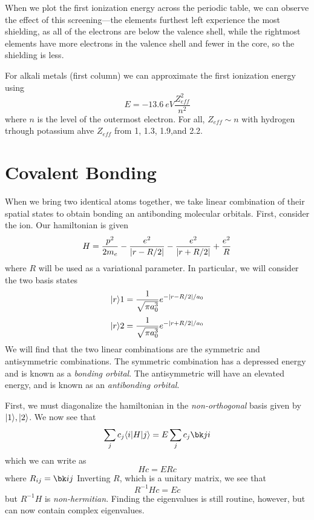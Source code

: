 When we plot the first ionization energy across the periodic table, we can observe the effect of this screening---the elements furthest left experience the most shielding, as all of the electrons are below the valence shell, while the rightmost elements have more electrons in the valence shell and fewer in the core, so the shielding is less. 

For alkali metals (first column) we can approximate the first ionization energy using
\[E = -\SI{13.6}{eV}\frac{Z_{eff}^2}{n^2}\]
where \(n\) is the level of the outermost electron. For all, \(Z_{eff}\sim n\) with hydrogen trhough potassium ahve \(Z_{eff}\) from 1, 1.3, 1.9,and 2.2.

\section{Covalent Bonding}
When we bring two identical atoms together, we take linear combination of their spatial states to obtain bonding an antibonding molecular orbitals. First, consider the  ion. Our hamiltonian is given
\[H = \frac{p^2}{2m_e}-\frac{e^2}{\left|r-R/2\right|}-\frac{e^2}{\left|r+R/2\right|} + \frac{e^2}{R}\]
where \(R\) will be used as a variational parameter. In particular, we will consider the two basis states
\[\lvert r\rangle{1} = \frac{1}{\sqrt{\pi a_0^3}}e^{-\left|r-R/2\right|/a_0}\]
\[\lvert r\rangle{2} = \frac{1}{\sqrt{\pi a_0^3}}e^{-\left|r+R/2\right|/a_0}\]
We will find that the two linear combinations are the symmetric and antisymmetric combinations. The symmetric combination has a depressed energy and is known as a \emph{bonding orbital}. The antisymmetric will have an elevated energy, and is known as an \emph{antibonding orbital}. 

First, we must diagonalize the hamiltonian in the \emph{non-orthogonal} basis given by \(\lvert1\rangle,\lvert2\rangle\). We now see that
\[\sum_j c_j \b i H\k j = E\sum_j c_j \bk j i\]
which we can write as
\[Hc = ERc\]
where \(R_{ij} = \bk ij\)
Inverting \(R\), which is a unitary matrix, we see that 
\[R^{-1}H c = Ec\]
but \(R^{-1}H\) is \emph{non-hermitian}. Finding the eigenvalues is still routine, however, but can now contain complex eigenvalues.

